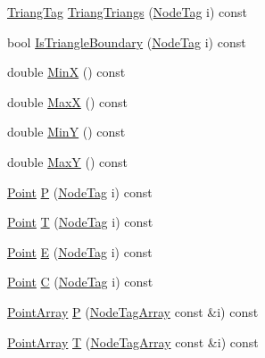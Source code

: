 \begin{DoxyCompactItemize}
\item 
\hyperlink{TriangMesh_8h_a278a4a778b70d153092ef4f362ec8bea}{Triang\+Tag} \hyperlink{structTriangMesh_ae90636c4abcb8e021e933f93484ddeef}{Triang\+Triangs} (\hyperlink{structTriangMesh_a9883abab211497b807f24e6e46f4b8f6}{Node\+Tag} i) const
\item 
bool \hyperlink{structTriangMesh_ae4a38de44007cce2fb0163d67a652493}{Is\+Triangle\+Boundary} (\hyperlink{structTriangMesh_a9883abab211497b807f24e6e46f4b8f6}{Node\+Tag} i) const
\item 
double \hyperlink{structTriangMesh_a20db4e9b5170193411c4f2add2ed5458}{MinX} () const
\item 
double \hyperlink{structTriangMesh_aeed0671b822f7934b58f05a4cdde35d0}{MaxX} () const
\item 
double \hyperlink{structTriangMesh_a521abe5c5037afba47b4e0d307144729}{MinY} () const
\item 
double \hyperlink{structTriangMesh_a0488ee177575bde01db0fd543d873b7a}{MaxY} () const
\item 
\hyperlink{PointOperations_8h_a71a59e5a162c0274a9af106af82cf198}{Point} \hyperlink{structTriangMesh_a981d7a016f1d82eb7970bd6a8749be3d}{P} (\hyperlink{structTriangMesh_a9883abab211497b807f24e6e46f4b8f6}{Node\+Tag} i) const
\item 
\hyperlink{PointOperations_8h_a71a59e5a162c0274a9af106af82cf198}{Point} \hyperlink{structTriangMesh_a4d6890abde7ec567f30c81cde2d066dd}{T} (\hyperlink{structTriangMesh_a9883abab211497b807f24e6e46f4b8f6}{Node\+Tag} i) const
\item 
\hyperlink{PointOperations_8h_a71a59e5a162c0274a9af106af82cf198}{Point} \hyperlink{structTriangMesh_a5e710c953a0d5c0f405eb679e41f087c}{E} (\hyperlink{structTriangMesh_a9883abab211497b807f24e6e46f4b8f6}{Node\+Tag} i) const
\item 
\hyperlink{PointOperations_8h_a71a59e5a162c0274a9af106af82cf198}{Point} \hyperlink{structTriangMesh_a119dc180ae15f2a72577eae96185ec94}{C} (\hyperlink{structTriangMesh_a9883abab211497b807f24e6e46f4b8f6}{Node\+Tag} i) const
\item 
\hyperlink{PointOperations_8h_aa878fb8322bc087b43ba840347e3469a}{Point\+Array} \hyperlink{structTriangMesh_a8888f7d4da5a8f56f6302f5653dcba11}{P} (\hyperlink{TriangMesh_8h_aec6495913a1e6aad9c6535102a4dd953}{Node\+Tag\+Array} const \&i) const
\item 
\hyperlink{PointOperations_8h_aa878fb8322bc087b43ba840347e3469a}{Point\+Array} \hyperlink{structTriangMesh_a4c1a60d7f6a81dc80cbeb47a00fedcc1}{T} (\hyperlink{TriangMesh_8h_aec6495913a1e6aad9c6535102a4dd953}{Node\+Tag\+Array} const \&i) const

\end{DoxyCompactItemize}
